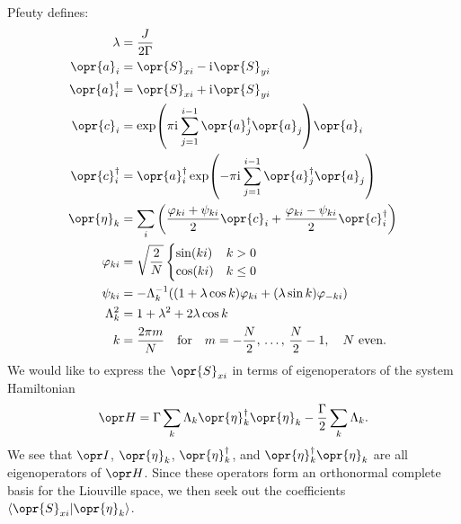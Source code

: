 \documentclass[../thesis.tex]{subfiles}
\begin{document}
Pfeuty defines:
\begin{align}
  \lambda
  &= \frac{J}{2\Gamma}
  \label{eq:pflambda} \\
  \opr{a}_i
  &= \opr{S}_{xi} - \im\opr{S}_{yi} 
  \label{eq:pfa} \\
  \opr{a}_i^\dag
  &= \opr{S}_{xi} + \im\opr{S}_{yi} 
  \label{eq:pfadag} \\
  \opr{c}_i
  &= \exp(\pi\im\sum_{j=1}^{i-1} \opr{a}_j^\dag\opr{a}_j)\opr{a}_i
  \label{eq:pfc} \\
  \opr{c}_i^\dag
  &= \opr{a}_i^\dag\exp(-\pi\im\sum_{j=1}^{i-1} \opr{a}_j^\dag\opr{a}_j)
  \label{eq:pfcdag} \\
  \opr{\eta}_k
  &= \sum_i \qty(\frac{\varphi_{ki} + \psi_{ki}}{2}\opr{c}_i
  + \frac{\varphi_{ki} - \psi_{ki}}{2}\opr{c}_i^\dag)
  \label{eq:pfeta} \\
  \varphi_{ki}
  &= \sqrt{\frac{2}{N}}\begin{cases}
    \sin(ki) & k > 0 \\
    \cos(ki) & k \le 0
  \end{cases}
  \label{eq:pfphi} \\
  \psi_{ki}
  &= -\Lambda_k^{-1} \qty((1 + \lambda\cos k)\varphi_{ki}
  + (\lambda\sin k)\varphi_{-ki})
  \label{eq:pfpsi} \\
  \Lambda_k^2
  &= 1 + \lambda^2 + 2\lambda\cos k
  \label{eq:pfLambda} \\
  k
  &= \frac{2\pi m}{N} \qfor m = -\frac{N}{2},\, \ldots,\, \frac{N}{2} - 1,
  \qq{$N$ even.}
  \label{eq:pfk}
\end{align}
We would like to express the $\opr{S}_{xi}$ in terms of eigenoperators of the
system Hamiltonian
\begin{equation}
  \ham
  = \Gamma\sum_k \Lambda_k \opr{\eta}_k^\dag\opr{\eta}_k
  - \frac{\Gamma}{2}\sum_k \Lambda_k.
  \label{eq:pfH}
\end{equation}
We see that $\idopr$, $\opr{\eta}_k$, $\opr{\eta}_k^\dag$, and
$\opr{\eta}_k^\dag\opr{\eta}_k$ are all eigenoperators of $\ham$. Since these
operators form an orthonormal complete basis for the Liouville space, we then
seek out the coefficients $\ip{\opr{S}_{xi}}{\opr{\eta}_k}$.
\end{document}
